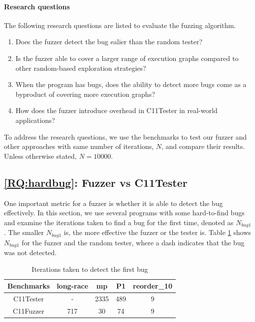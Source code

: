 \paragraph*{Research questions} The following research questions are listed to evaluate the fuzzing algorithm.
\begin{enumerate}[label=RQ\arabic*]
	\item Does the fuzzer detect the bug ealier than the random tester? \label{RQ:hardbug}
	\item Is the fuzzer able to cover a larger range of execution graphs compared to other random-based exploration strategies? \label{RQ:coverage}
	\item When the program has bugs, does the ability to detect more bugs come as a byproduct of covering more execution graphs? \label{RQ:bug}
	\item How does the fuzzer introduce overhead in C11Tester in real-world applications? \label{RQ:overhead}
\end{enumerate}

To address the research questions, we use the benchmarks to test our fuzzer and other approaches with same number of iterations, $N$, and compare their results. Unless otherwise stated, $N = 10000$.

\subsection{\ref*{RQ:hardbug}: Fuzzer vs C11Tester}

One important metric for a fuzzer is whether it is able to detect the bug effectively. In this section, we use several programs with some hard-to-find bugs and examine the iterations taken to find a bug for the first time, denoted as $N_{bug1}$. The smaller $N_{bug1}$ is, the more effective the fuzzer or the tester is. Table \ref{c11fuzzer-hardbug} shows $N_{bug1}$ for the fuzzer and the random tester, where a dash indicates that the bug was not detected.
\begin{table}[h!]
	\centering
	\begin{tabular}{ |c|cccc| }
		\hline
		Benchmarks  & long-race & mp & P1  & reorder\_10 \\
		\hline
		C11Tester             & -         & 2335  & 489 & 9           \\
		C11Fuzzer              & 717       & 30 & 74  & 9           \\
		\hline
	\end{tabular}
	\caption{Iterations taken to detect the first bug}
	\label{c11fuzzer-hardbug}
\end{table}


